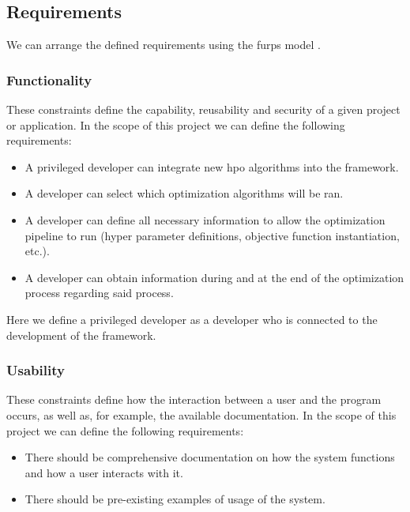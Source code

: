 
\subsection{Requirements}


We can arrange the defined requirements using the \acrfull{furps} model \parencite{furps}.

\subsubsection{Functionality}

These constraints define the capability, reusability and security of a given project or application. In the scope of this project we can define the following requirements:

\begin{itemize}
	\item A privileged developer can integrate new \acrshort{hpo} algorithms into the framework.
	\item A developer can select which optimization algorithms will be ran.
	\item A developer can define all necessary information to allow the optimization pipeline to run (hyper parameter definitions, objective function instantiation, etc.).
	\item A developer can obtain information during and at the end of the optimization process regarding said process.
\end{itemize}

Here we define a privileged developer as a developer who is connected to the development of the framework.

\subsubsection{Usability}

These constraints define how the interaction between a user and the program occurs, as well as, for example, the available documentation. In the scope of this project we can define the following requirements:

\begin{itemize}
	\item There should be comprehensive documentation on how the system functions and how a user interacts with it.
	\item There should be pre-existing examples of usage of the system.
\end{itemize}

